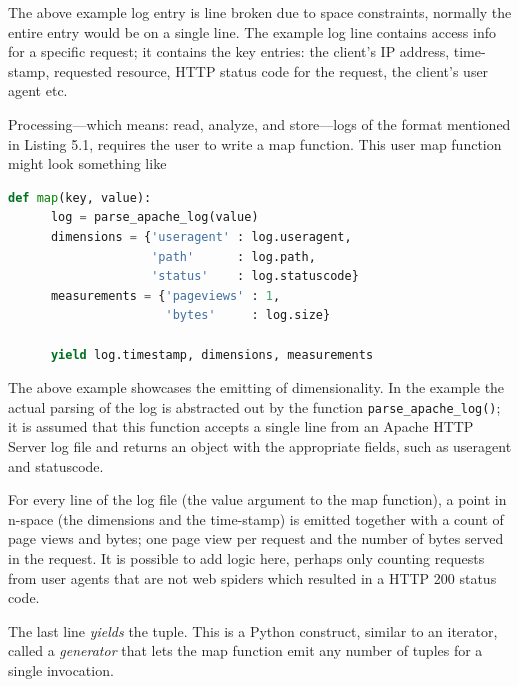 \vspace{12pt}

The above example log entry is line broken due to space constraints, normally
the entire entry would be on a single line. The example log line contains access
info for a specific request; it contains the key entries: the client's IP
address, time-stamp, requested resource, HTTP status code for the request, the
client's user agent etc.

Processing---which means: read, analyze, and store---logs of the format
mentioned in Listing 5.1, requires the user to write a map function. This user
map function might look something like

\vspace{12pt}

\begin{lstlisting}[language=Python,caption={An example map function, parsing
Apache access logs.},captionpos=b]
   def map(key, value):
      log = parse_apache_log(value)
      dimensions = {'useragent' : log.useragent,
                    'path'      : log.path,
                    'status'    : log.statuscode}
      measurements = {'pageviews' : 1,
                      'bytes'     : log.size}

      yield log.timestamp, dimensions, measurements
\end{lstlisting}

\vspace{12pt}

The above example showcases the emitting of dimensionality. In the example the
actual parsing of the log is abstracted out by the function
\texttt{parse\_apache\_log()}; it is assumed that this function accepts a single
line from an Apache HTTP Server log file and returns an object with the
appropriate fields, such as useragent and statuscode.

For every line of the log file (the value argument to the map function), a point
in n-space (the dimensions and the time-stamp) is emitted together with a count
of page views and bytes; one page view per request and the number of bytes served
in the request. It is possible to add logic here, perhaps only counting requests
from user agents that are not web spiders which resulted in a HTTP 200 status
code.

The last line \textit{yields} the tuple. This is a Python construct, similar to
an iterator, called a \textit{generator} that lets the map function emit any
number of tuples for a single invocation.

